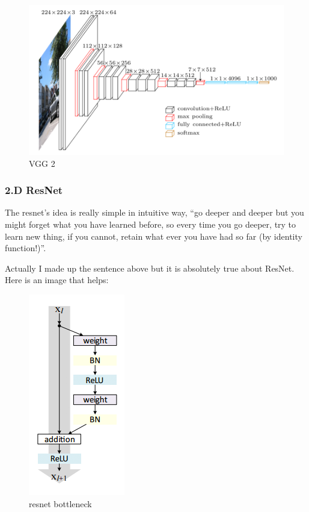 \documentclass[11pt]{article}
\makeatletter
\def\maxwidth{\ifdim\Gin@nat@width>\linewidth\linewidth
    \else\Gin@nat@width\fi}
\let\Oldincludegraphics\includegraphics
\renewcommand{\includegraphics}[1]{\Oldincludegraphics[width=.8\maxwidth]{#1}}
\makeatother
\begin{document}
\begin{figure}
\centering
\includegraphics{wiki/2_4.png}
\caption{VGG 2}
\end{figure}

    \hypertarget{d-resnet}{%
\subsubsection{2.D ResNet}\label{d-resnet}}

The resnet's idea is really simple in intuitive way, ``go deeper and
deeper but you might forget what you have learned before, so every time
you go deeper, try to learn new thing, if you cannot, retain what ever
you have had so far (by identity function!)''.

Actually I made up the sentence above but it is absolutely true about
ResNet. Here is an image that helps:

\begin{figure}
\centering
\includegraphics{wiki/2_5.png}
\caption{resnet bottleneck}
\end{figure}
\end{document}
